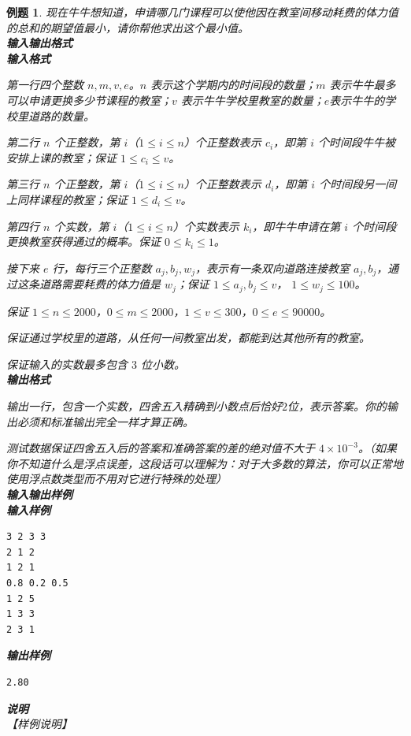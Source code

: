 \documentclass{article}
\newtheorem{example}{例题}[subsection]
\theoremstyle{nonumberplain}
\begin{document}
\begin{example}
		现在牛牛想知道，申请哪几门课程可以使他因在教室间移动耗费的体力值的总和的期望值最小，请你帮他求出这个最小值。\\
		\textbf{输入输出格式}\\
		\textbf{输入格式}

		第一行四个整数 $n,m,v,e$。$n$ 表示这个学期内的时间段的数量；$m$ 表示牛牛最多可以申请更换多少节课程的教室；$v$ 表示牛牛学校里教室的数量；$e$表示牛牛的学校里道路的数量。

		第二行 $n$ 个正整数，第 $i$（$1 \leq i \leq n$）个正整数表示 $c_i$，即第 $i$ 个时间段牛牛被安排上课的教室；保证 $1 \le c_i \le v$。

		第三行 $n$ 个正整数，第 $i$（$1 \leq i \leq n$）个正整数表示 $d_i$，即第 $i$ 个时间段另一间上同样课程的教室；保证 $1 \le d_i \le v$。

		第四行 $n$ 个实数，第 $i$（$1 \leq i \leq n$）个实数表示 $k_i$，即牛牛申请在第 $i$ 个时间段更换教室获得通过的概率。保证 $0 \le k_i \le 1$。

		接下来 $e$ 行，每行三个正整数 $a_j, b_j, w_j$，表示有一条双向道路连接教室 $a_j, b_j$，通过这条道路需要耗费的体力值是 $w_j$；保证 $1 \le a_j, b_j \le v$， $1 \le w_j \le 100$。

		保证 $1 \leq n \leq 2000$，$0 \leq m \leq 2000$，$1 \leq v \leq 300$，$0 \leq e \leq 90000$。

		保证通过学校里的道路，从任何一间教室出发，都能到达其他所有的教室。

		保证输入的实数最多包含 $3$ 位小数。\\
		\textbf{输出格式}

		输出一行，包含一个实数，四舍五入精确到小数点后恰好$2$位，表示答案。你的输出必须和标准输出完全一样才算正确。

		测试数据保证四舍五入后的答案和准确答案的差的绝对值不大于 $4 \times 10^{-3}$。（如果你不知道什么是浮点误差，这段话可以理解为：对于大多数的算法，你可以正常地使用浮点数类型而不用对它进行特殊的处理）\ \\
		\textbf{输入输出样例}\\
		\textbf{输入样例}
		\begin{verbatim}
3 2 3 3
2 1 2
1 2 1
0.8 0.2 0.5 
1 2 5
1 3 3
2 3 1
\end{verbatim}
		\textbf{输出样例}
		\begin{verbatim}
2.80
\end{verbatim}
		\textbf{说明}\\
		【样例说明】


\end{example}
\end{document}
